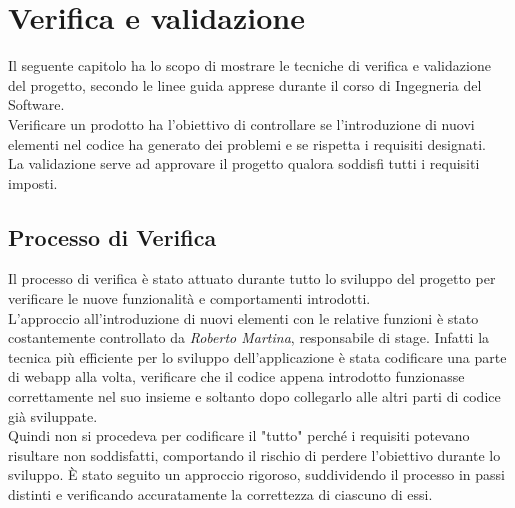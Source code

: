 \chapter{Verifica e validazione}
\label{cap:verifica-validazione}

Il seguente capitolo ha lo scopo di mostrare le tecniche di verifica e validazione del progetto, secondo le linee guida apprese durante il corso di Ingegneria del Software. \\
Verificare un prodotto ha l'obiettivo di controllare se l'introduzione di nuovi elementi nel codice ha generato dei problemi e se rispetta i requisiti designati. 
\\La validazione serve ad approvare il progetto qualora soddisfi tutti i requisiti imposti.

\section{Processo di Verifica}
Il processo di verifica è stato attuato durante tutto lo sviluppo del progetto per verificare le nuove funzionalità e comportamenti introdotti.\\
L'approccio all'introduzione di nuovi elementi con le relative funzioni è stato costantemente controllato da \textit{Roberto Martina}, responsabile di stage. Infatti  la tecnica più efficiente per lo sviluppo dell'applicazione è stata codificare una parte di webapp alla volta, verificare che il codice appena introdotto funzionasse correttamente nel suo insieme e soltanto dopo collegarlo alle altri parti di codice già sviluppate.\\
Quindi non si procedeva per codificare il "tutto" perché i requisiti potevano risultare non soddisfatti, comportando  il rischio di perdere l'obiettivo durante lo sviluppo. È stato seguito un approccio rigoroso, suddividendo il processo in passi distinti e verificando accuratamente la correttezza di ciascuno di essi.

